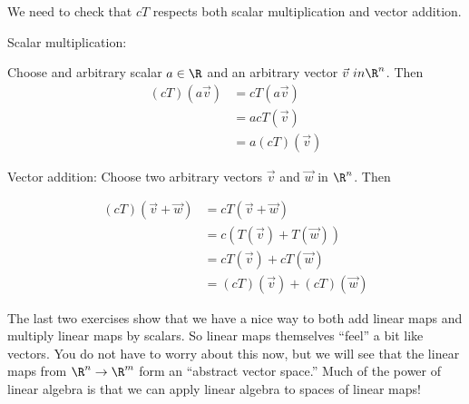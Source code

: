 \documentclass{ximera}
\begin{document}
\begin{free-response}
We need to check that $cT$ respects both scalar multiplication and vector addition.
 
 Scalar multiplication:
 
 Choose and arbitrary scalar $a \in \R$ and an arbitrary vector $\vec{v} \ in \R^n$.  Then
 	\begin{align*}
 		(cT)(a\vec{v}) &= cT(a\vec{v})\\
 		&= acT(\vec{v})\\
 		&=a(cT)(\vec{v})
 	\end{align*}
 	
 	Vector addition:
 	Choose two arbitrary vectors $\vec{v}$ and $\vec{w}$ in $\R^n$.  Then
 	
 	\begin{align*}
 		(cT)(\vec{v}+\vec{w}) &= cT(\vec{v}+\vec{w})\\
 		&= c\left(T(\vec{v})+T(\vec{w})\right)\\
 		&=cT(\vec{v})+cT(\vec{w})\\
 		&=(cT)(\vec{v})+(cT)(\vec{w})
 	\end{align*}
\end{free-response}


\begin{observation}
  The last two exercises show that we have a nice way to both add
  linear maps and multiply linear maps by scalars.  So linear maps
  themselves ``feel'' a bit like vectors.  You do not have to worry
  about this now, but we will see that the linear maps from $\R^n \to
  \R^m$ form an ``abstract vector space.''  Much of the power of
  linear algebra is that we can apply linear algebra to spaces of
  linear maps!
\end{observation}
	
\end{document}
